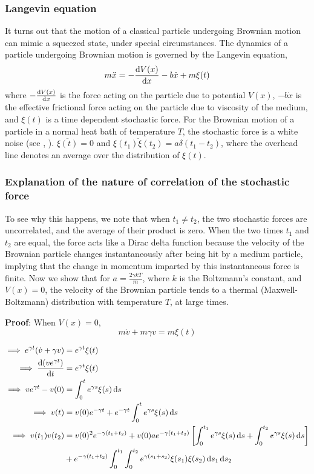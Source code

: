 \documentclass[12pt, twoside]{article}
\begin{document}
\subsubsection{Langevin equation}
It turns out that the motion of a classical particle undergoing Brownian motion can mimic a squeezed state, under special circumstances. The dynamics of a particle undergoing Brownian motion is governed by the Langevin equation,\begin{equation}\label{eq:Langevin}m \ddot{x} = -\derivative{V(x)}{x} - b \dot{x} + m \xi(t)\end{equation} where $-\derivative{V(x)}{x}$ is the force acting on the particle due to potential $V(x)$, $-b\dot{x}$ is the effective frictional force acting on the particle due to viscosity of the medium, and $\xi(t)$ is a time dependent stochastic force.
For the Brownian motion of a particle in a normal heat bath of temperature $T$, the stochastic force is a white noise (see \cite{wikipedia_white_noise}, \cite{brownian_motion_riemann}). $\overline{\xi(t)} = 0$ and $\overline{\xi(t_1)\xi(t_2)} = a \delta(t_1 - t_2)$, where the overhead line denotes an average over the distribution of $\xi(t)$.
\subsubsection{Explanation of the nature of correlation of the stochastic force}\label{fluctuation_dissipation_proof} To see why this happens, we note that when $t_1 \neq t_2$, the two stochastic forces are uncorrelated, and the average of their product is zero. When the two times $t_1$ and $t_2$ are equal, the force acts like a Dirac delta function because the velocity of the Brownian particle changes instantaneously after being hit by a medium particle, implying that the change in momentum imparted by this instantaneous force is finite. Now we show that for $a = \frac{2 \gamma k T}{m}$, where $k$ is the Boltzmann's constant, and $V(x) = 0$, the velocity of the Brownian particle tends to a thermal (Maxwell-Boltzmann) distribution with temperature $T$, at large times.

\textbf{Proof}: When $V(x) = 0$,\begin{equation}\label{eq:lang_no_pot}
	m\dot{v}+m\gamma v = m \xi(t)
\end{equation} 

$\begin{aligned}\implies e^{\gamma t}(\dot{v}+\gamma v) &= e^{\gamma t} \xi(t) \\ \implies \derivative{(ve^{\gamma t})}{t} &= e^{\gamma t} \xi(t)
\\ \implies ve^{\gamma t} - v(0) &= \int_{0}^{t} e^{\gamma s} \xi(s) \dd{s}
\\ \implies v(t)  &= v(0) e^{-\gamma t} + e^{-\gamma t} \int_{0}^{t} e^{\gamma s} \xi(s) \dd{s}
\\ \implies v(t_1) v(t_2) &= v(0)^2 e^{-\gamma(t_1 + t_2)} + v(0) a e^{-\gamma(t_1 + t_2)} \left[\int_{0}^{t_1} e^{\gamma s} \xi(s) \dd{s} + \int_{0}^{t_2} e^{\gamma s} \xi(s) \dd{s}\right] \\&+ e^{-\gamma(t_1 + t_2)} \int_{0}^{t_1}\int_{0}^{t_2} e^{\gamma(s_1 + s_2)} \xi(s_1)\xi(s_2) \dd{s_1} \dd{s_2} \end{aligned}$
\end{document}
